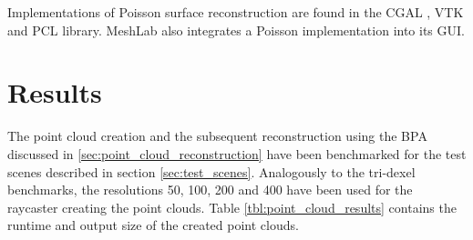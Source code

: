 \begin{description}
	Implementations of Poisson surface reconstruction are found in \eg the CGAL \cite{cgal_poisson}, VTK \cite{vtk_poisson} and PCL \cite{pcl} library.
	MeshLab also integrates a Poisson implementation into its GUI.
\end{description}


\section{Results}
\label{sec:point_cloud_results}

The point cloud creation and the subsequent reconstruction using the BPA discussed in \ref{sec:point_cloud_reconstruction} have been benchmarked for the test scenes described in section \ref{sec:test_scenes}.
Analogously to the tri-dexel benchmarks, the resolutions 50, 100, 200 and 400 have been used for the raycaster creating the point clouds.
Table \ref{tbl:point_cloud_results} contains the runtime and output size of the created point clouds.
%
